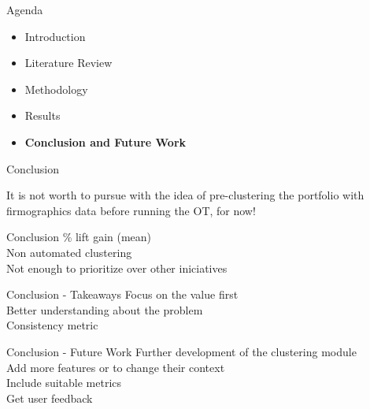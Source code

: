 \begin{frame}{Agenda}
\begin{itemize}
    \item Introduction
    \item Literature Review
    \item Methodology
    \item Results
    \item \textbf{Conclusion and Future Work}
\end{itemize}
\end{frame}


\begin{frame}{Conclusion} \pause
    \begin{center}
        \huge{It is not worth to pursue with the idea of pre-clustering the portfolio with firmographics data before running the OT\pause , for now!}
    \end{center}
\end{frame}


\begin{frame}{Conclusion} \% lift gain (mean) \\ \pause
    \vspace{0.5cm}
    Non automated clustering \\ \pause
    \vspace{0.5cm}
    Not enough to prioritize over other iniciatives
\end{frame}


\begin{frame}{Conclusion - Takeaways} \pause
    Focus on the value first \\ \pause
    \vspace{0.5cm}
    Better understanding about the problem \\ \pause
    \vspace{0.5cm}
    Consistency metric
\end{frame}


\begin{frame}{Conclusion - Future Work} \pause
    Further development of the clustering module \\ \pause
    \vspace{0.5cm}
    Add more features or to change their context \\ \pause
    \vspace{0.5cm}
    Include suitable metrics \\ \pause
    \vspace{0.5cm}
    Get user feedback
\end{frame}